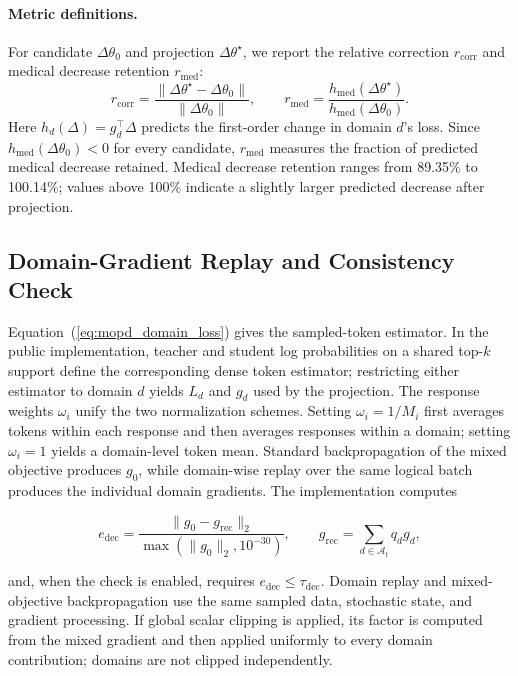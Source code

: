 \documentclass{article}
\begin{document}
\paragraph{Metric definitions.}
For candidate $\Delta\theta_0$ and projection $\Delta\theta^\star$,
we report the relative correction $r_{\mathrm{corr}}$ and medical
decrease retention $r_{\mathrm{med}}$:
\begin{equation}
r_{\mathrm{corr}}
=
\frac{\|\Delta\theta^\star-\Delta\theta_0\|}
     {\|\Delta\theta_0\|},
\qquad
r_{\mathrm{med}}
=
\frac{h_{\mathrm{med}}(\Delta\theta^\star)}
     {h_{\mathrm{med}}(\Delta\theta_0)}.
\end{equation}
Here $h_d(\Delta)=g_d^\top\Delta$ predicts the first-order change in
domain $d$'s loss.
Since $h_{\mathrm{med}}(\Delta\theta_0)<0$ for every candidate,
$r_{\mathrm{med}}$ measures the fraction of predicted medical
decrease retained.
Medical decrease retention ranges from 89.35\% to 100.14\%;
values above 100\% indicate a slightly larger predicted decrease
after projection.
\subsection{Domain-Gradient Replay and Consistency Check}
\label{app:domain_replay}

Equation~(\ref{eq:mopd_domain_loss}) gives the sampled-token estimator. In the public implementation, teacher and student log probabilities on a shared top-$k$ support define the corresponding dense token estimator; restricting either estimator to domain $d$ yields $L_d$ and $g_d$ used by the projection. The response weights $\omega_i$ unify the two normalization schemes. Setting $\omega_i=1/M_i$ first averages tokens within each response and then averages responses within a domain; setting $\omega_i=1$ yields a domain-level token mean. Standard backpropagation of the mixed objective produces $g_0$, while domain-wise replay over the same logical batch produces the individual domain gradients. The implementation computes

\[
e_{\mathrm{dec}}
=\frac{\|g_0-g_{\mathrm{rec}}\|_2}
{\max(\|g_0\|_2,10^{-30})},
\qquad
g_{\mathrm{rec}}=\sum_{d\in\mathcal A_t}q_dg_d,
\tag{C.1}
\]

and, when the check is enabled, requires $e_{\mathrm{dec}}\le\tau_{\mathrm{dec}}$. Domain replay and mixed-objective backpropagation use the same sampled data, stochastic state, and gradient processing. If global scalar clipping is applied, its factor is computed from the mixed gradient and then applied uniformly to every domain contribution; domains are not clipped independently.
\end{document}
